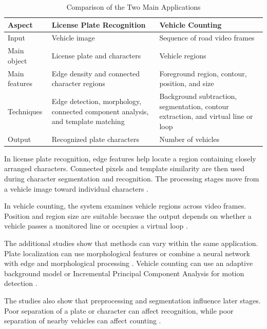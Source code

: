 \documentclass[conference]{IEEEtran}
\begin{document}
	\begin{table}[htbp]
		\caption{Comparison of the Two Main Applications}
		\label{tab:comparison}
		\centering
		\footnotesize
		\begin{tabular}{|p{}|p{}|p{}|}
			\hline
			\textbf{Aspect} & \textbf{License Plate Recognition} &
			\textbf{Vehicle Counting} \\
			\hline
			Input & Vehicle image & Sequence of road video frames \\
			\hline
			Main object & License plate and characters & Vehicle regions \\
			\hline
			Main features & Edge density and connected character regions &
			Foreground region, contour, position, and size \\
			\hline
			Techniques & Edge detection, morphology, connected component analysis,
			and template matching & Background subtraction, segmentation, contour
			extraction, and virtual line or loop \\
			\hline
			Output & Recognized plate characters & Number of vehicles \\
			\hline
		\end{tabular}
	\end{table}
	
	In license plate recognition, edge features help locate a region
	containing closely arranged characters. Connected pixels and template
	similarity are then used during character segmentation and recognition.
	The processing stages move from a vehicle image toward individual
	characters \cite{arafat2020}.
	
	In vehicle counting, the system examines vehicle regions across video
	frames. Position and region size are suitable because the output
	depends on whether a vehicle passes a monitored line or occupies a
	virtual loop \cite{liu2017}.
	
	The additional studies show that methods can vary within the same
	application. Plate localization can use morphological features
	\cite{yepez2018} or combine a neural network with edge and
	morphological processing \cite{kim2019}. Vehicle counting can use an
	adaptive background model \cite{liu2017} or Incremental Principal
	Component Analysis for motion detection \cite{rosas2019}.
	
	The studies also show that preprocessing and segmentation influence
	later stages. Poor separation of a plate or character can affect
	recognition, while poor separation of nearby vehicles can affect
	counting \cite{arafat2020,liu2017}.
	
\end{document}
